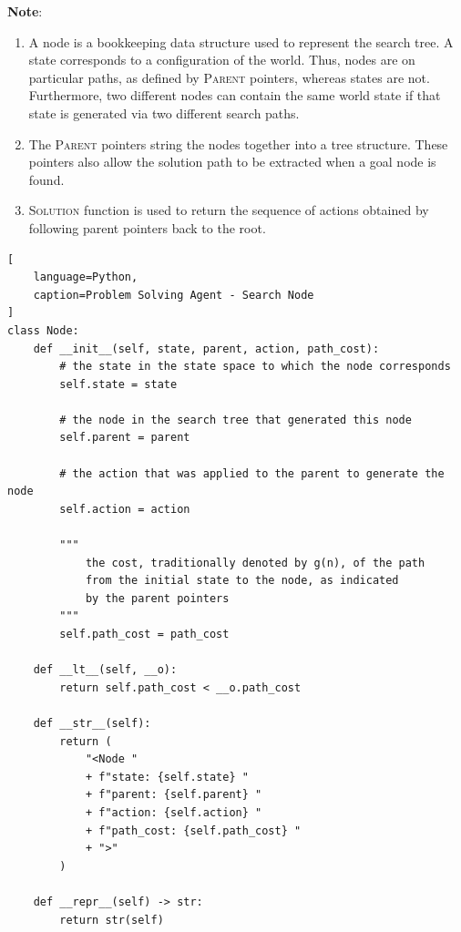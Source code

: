 \textbf{Note}:
\begin{enumerate}
    \item A node is a bookkeeping data structure used to represent the search tree. 
    A state corresponds to a configuration of the world. 
    Thus, nodes are on particular paths, as defined by \textsc{Parent} pointers, whereas states are not. 
    Furthermore, two different nodes can contain the same world state if that state is generated via two different search paths.
    \hfill \cite{ai/book/Artificial-Intelligence-A-Modern-Approach/Russell-Norvig}

    \item The \textsc{Parent} pointers string the nodes together into a tree structure. These pointers also allow the solution path to be extracted when a goal node is found.
    \hfill \cite{ai/book/Artificial-Intelligence-A-Modern-Approach/Russell-Norvig}

    \item \textsc{Solution} function is used to return the sequence of actions obtained by following parent pointers back to the root.
    \hfill \cite{ai/book/Artificial-Intelligence-A-Modern-Approach/Russell-Norvig}
\end{enumerate}

\vspace{0.5cm}

\begin{lstlisting}[
    language=Python,
    caption=Problem Solving Agent - Search Node
]
class Node:
    def __init__(self, state, parent, action, path_cost):
        # the state in the state space to which the node corresponds
        self.state = state

        # the node in the search tree that generated this node
        self.parent = parent

        # the action that was applied to the parent to generate the node
        self.action = action

        """
            the cost, traditionally denoted by g(n), of the path
            from the initial state to the node, as indicated
            by the parent pointers
        """
        self.path_cost = path_cost
    
    def __lt__(self, __o):
        return self.path_cost < __o.path_cost

    def __str__(self):
        return (
            "<Node "
            + f"state: {self.state} "
            + f"parent: {self.parent} "
            + f"action: {self.action} "
            + f"path_cost: {self.path_cost} "
            + ">"
        )
    
    def __repr__(self) -> str:
        return str(self)
\end{lstlisting}



